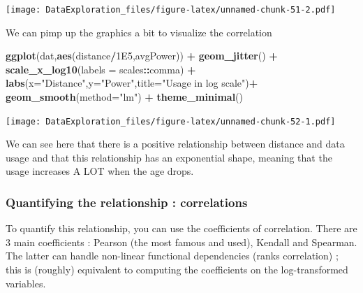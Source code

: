 \documentclass[
]{book}
\newenvironment{Shaded}{\begin{snugshade}}{\end{snugshade}}
\newcommand{\CommentTok}[1]{\textcolor[rgb]{0.56,0.35,0.01}{\textit{#1}}}
\newcommand{\DataTypeTok}[1]{\textcolor[rgb]{0.13,0.29,0.53}{#1}}
\newcommand{\FloatTok}[1]{\textcolor[rgb]{0.00,0.00,0.81}{#1}}
\newcommand{\KeywordTok}[1]{\textcolor[rgb]{0.13,0.29,0.53}{\textbf{#1}}}
\newcommand{\NormalTok}[1]{#1}
\newcommand{\OperatorTok}[1]{\textcolor[rgb]{0.81,0.36,0.00}{\textbf{#1}}}
\newcommand{\StringTok}[1]{\textcolor[rgb]{0.31,0.60,0.02}{#1}}
\begin{document}
\texttt{[image: DataExploration\_files/figure-latex/unnamed-chunk-51-2.pdf]}

We can pimp up the graphics a bit to visualize the correlation

\begin{Shaded}
\begin{Highlighting}[]
\KeywordTok{ggplot}\NormalTok{(dat,}\KeywordTok{aes}\NormalTok{(distance}\OperatorTok{/}\FloatTok{1E5}\NormalTok{,avgPower)) }\OperatorTok{+}\StringTok{ }\KeywordTok{geom_jitter}\NormalTok{() }\OperatorTok{+}\StringTok{ }\KeywordTok{scale_x_log10}\NormalTok{(}\DataTypeTok{labels =}\NormalTok{ scales}\OperatorTok{::}\NormalTok{comma) }\OperatorTok{+}\StringTok{ }
\StringTok{  }\KeywordTok{labs}\NormalTok{(}\DataTypeTok{x=}\StringTok{"Distance"}\NormalTok{,}\DataTypeTok{y=}\StringTok{"Power"}\NormalTok{,}\DataTypeTok{title=}\StringTok{"Usage in log scale"}\NormalTok{)}\OperatorTok{+}\StringTok{  }\KeywordTok{geom_smooth}\NormalTok{(}\DataTypeTok{method=}\StringTok{"lm"}\NormalTok{) }\OperatorTok{+}\StringTok{ }\KeywordTok{theme_minimal}\NormalTok{()}
\end{Highlighting}
\end{Shaded}

\texttt{[image: DataExploration\_files/figure-latex/unnamed-chunk-52-1.pdf]}

We can see here that there is a positive relationship between distance and data usage and that this relationship has an exponential shape, meaning that the usage increases A LOT when the age drops.

\hypertarget{quantifying-the-relationship-correlations}{%
\subsubsection{\texorpdfstring{Quantifying the relationship : correlation\textbf{s}}{Quantifying the relationship : correlations}}\label{quantifying-the-relationship-correlations}}

To quantify this relationship, you can use the coefficients of correlation. There are 3 main coefficients : Pearson (the most famous and used), Kendall and Spearman. The latter can handle non-linear functional dependencies (ranks correlation) ; this is (roughly) equivalent to computing the coefficients on the log-transformed variables.

\begin{Shaded}
\end{Shaded}
\end{document}
